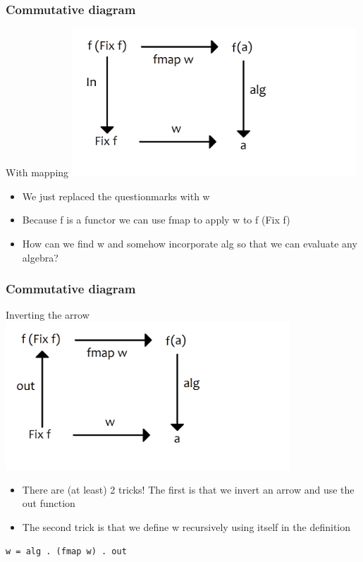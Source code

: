 \documentclass[10pt]{beamer}
\begin{document}
\begin{frame}[fragile]
\frametitle{Commutative diagram}

\begin{block}{With mapping}
\includegraphics[width=0.8\textwidth]{graf3.png}	
\end{block}
\begin{itemize}
\item We just replaced the questionmarks with w
\item Because f is a functor we can use fmap to apply w to f (Fix f)	
\item How can we find w and somehow incorporate alg so that we can evaluate any algebra? 	
\end{itemize}

\end{frame}





\begin{frame}[fragile]
\frametitle{Commutative diagram}

\begin{block}{Inverting the arrow}
\includegraphics[width=0.8\textwidth]{graf4.png}	
\end{block}
\begin{itemize}
\item There are (at least) 2 tricks! The first is that we invert an arrow and use the out function
\item The second trick is that we define w recursively using itself in the definition	
\end{itemize}

\begin{lstlisting}
w = alg . (fmap w) . out
\end{lstlisting}

\end{frame}
\end{document}
